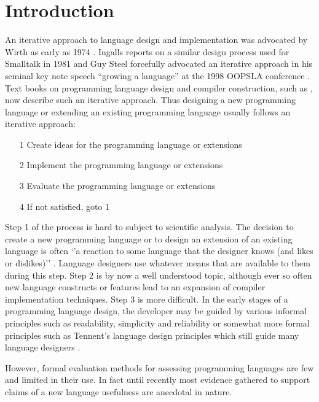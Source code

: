 \documentclass[preprint,10pt]{sigplanconf}
\begin{document}
\section{Introduction}
An iterative approach to language design and implementation was advocated by Wirth as early as 1974 \cite{wirth1974design}.
Ingalls reports on a similar design process used for Smalltalk in 1981 \cite{ingalls1981design} and
Guy Steel forcefully advocated an iterative approach in his seminal key note speech ``growing a language'' at the 1998 OOPSLA conference \cite{steele1999growing}.
Text books on programming language design and compiler construction, such as \cite{watt2000programming}, now describe such an iterative approach.
Thus designing a new programming language or extending an existing programming language usually follows an iterative approach:
\begin{itemize}
\item[1] Create ideas for the programming language or extensions
\item[2] Implement  the programming language or extensions
\item[3] Evaluate  the programming language or extensions
\item[4] If not satisfied, goto 1
\end{itemize}



Step 1 of the process is hard to subject to scientific analysis. The decision to create a new programming language or to design an extension of an existing language is often `'a reaction to some language that the designer knows (and likes or dislikes)'' \cite{sestoft2012programming}. Language designers use whatever means that are available to them during this step. Step 2 is by now a well understood topic, although ever so often new language constructs or features lead to an expansion of compiler implementation techniques. Step 3 is more difficult. In the early stages of a programming language design, the developer may be guided by various informal principles such as readability, simplicity and reliability \cite{pratt1984programming,sebesta2012concepts} or somewhat more formal principles such as Tennent's language design principles \cite{tennent1981principles} which still guide many language designers \cite{sestoft2012programming}.

However, formal evaluation methods for assessing programming languages are few and limited in their use. In fact until recently most evidence gathered to support claims of a new language usefulness are anecdotal in nature\cite{StakingClaims}. 
\end{document}
